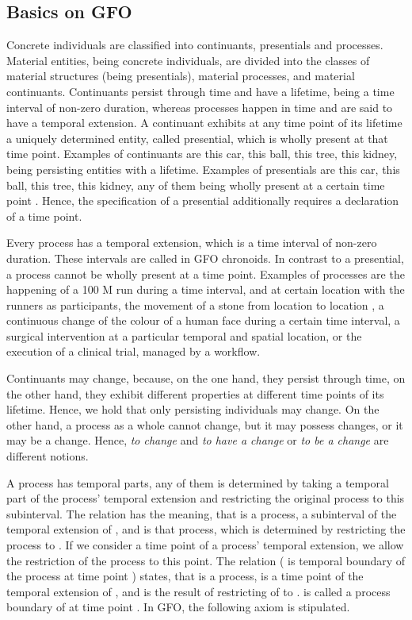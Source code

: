\documentclass{ao2e}
\begin{document}
{\subsection{Basics on GFO}

Concrete individuals are classified into continuants, presentials and processes. 
Material entities, being concrete individuals,  are divided into the classes of
material structures (being presentials), material processes, and material continuants.
 Continuants persist through time and have a lifetime, being a time interval of non-zero duration, whereas processes happen in time and are said to have a temporal extension. A continuant exhibits at any time point of its lifetime a uniquely determined entity, called presential, which is wholly present at that time point. Examples of continuants are this car, this ball, this tree, this kidney, being persisting entities with a lifetime. Examples of presentials are this car, this ball, this tree, this kidney, any of them being wholly present at a certain time point . Hence, the specification of a presential additionally requires a declaration of a time point.

 Every process  has a temporal extension, which is a time interval of non-zero duration. These intervals are called in GFO chronoids.  In contrast to a presential, a process cannot be wholly present at a time point. Examples of processes are the happening of a 100 M run during a time interval, and at certain location with the runners as participants, the movement of a stone from location  to location , a continuous change of the colour of a human face during a certain time interval, a surgical intervention at a particular temporal and spatial location, or the execution of a clinical trial, managed by a workflow.

Continuants may change, because, on the one hand, they persist through time, on the other hand, they exhibit different properties at different time points of its lifetime. Hence, we hold that only persisting individuals may change. On the other hand, a process as a whole cannot change, but it may possess changes, or it may be a change. Hence, {\it to change} and {\it to have a change} or {\it to be a change} are different notions.

A process has temporal parts, any of them is determined by taking a temporal part of the process' temporal extension and restricting the original process to this subinterval. The relation  has the meaning, that  is a process,  a subinterval of the temporal extension of , and  is that process, which is determined by restricting the process  to . If we consider a time point of a process' temporal extension, we allow the restriction of the process to this point. The relation  ( is temporal boundary of the process  at time point ) states, that  is a process,  is a time point of the temporal extension of , and  is the result of restricting of  to .  is called a process boundary of  at time point . In GFO, the following axiom is stipulated.

}
\end{document}
